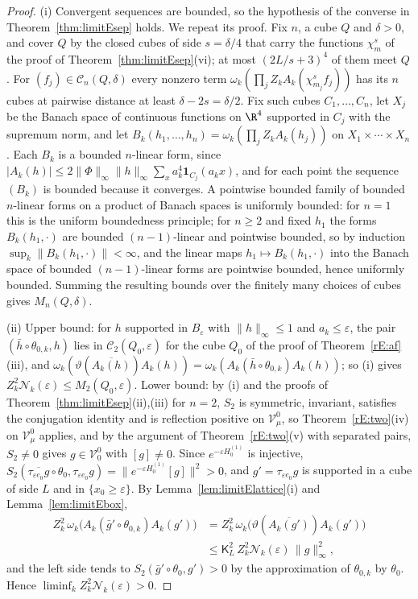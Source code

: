 \begin{proof}
(i) Convergent sequences are bounded, so the hypothesis of the converse in
Theorem~\ref{thm:limitEsep} holds. We repeat its proof. Fix $n$, a cube $Q$
and $\delta>0$, and cover $Q$ by the closed cubes of side $s=\delta/4$ that
carry the functions $\chi^s_m$ of the proof of Theorem~\ref{thm:limitEsep}(vi);
at most $(2L/s+3)^4$ of them meet $Q$. For $(f_j)\in\mathcal C_n(Q,\delta)$
every nonzero term $\omega_k(\prod_jZ_kA_k(\chi^s_{m_j}f_j))$ has its $n$
cubes at pairwise distance at least $\delta-2s=\delta/2$. Fix such cubes
$C_1,\dots,C_n$, let $X_j$ be the Banach space of continuous functions on
$\R^4$ supported in $C_j$ with the supremum norm, and let $B_k(h_1,\dots,
h_n)=\omega_k(\prod_jZ_kA_k(h_j))$ on $X_1\times\cdots\times X_n$. Each $B_k$
is a bounded $n$-linear form, since $|A_k(h)|\le2\|\Phi\|_\infty\|h\|_\infty
\sum_xa_k^4\mathbf 1_{C_j}(a_kx)$, and for each point the sequence $(B_k)$
is bounded because it converges. A pointwise bounded family of bounded
$n$-linear forms on a product of Banach spaces is uniformly bounded: for
$n=1$ this is the uniform boundedness principle; for $n\ge2$ and fixed $h_1$
the forms $B_k(h_1,\cdot)$ are bounded $(n-1)$-linear and pointwise bounded,
so by induction $\sup_k\|B_k(h_1,\cdot)\|<\infty$, and the linear maps $h_1
\mapsto B_k(h_1,\cdot)$ into the Banach space of bounded $(n-1)$-linear
forms are pointwise bounded, hence uniformly bounded. Summing the resulting
bounds over the finitely many choices of cubes gives $M_n(Q,\delta)$.

(ii) Upper bound: for $h$ supported in $B_\varepsilon$ with $\|h\|_\infty\le
1$ and $a_k\le\varepsilon$, the pair $(\bar h\circ\theta_{0,k},h)$ lies in
$\mathcal C_2(Q_0,\varepsilon)$ for the cube $Q_0$ of the proof of
Theorem~\ref{rE:af}(iii), and $\omega_k(\vartheta(\overline{A_k(h)})A_k(h))=
\omega_k(A_k(\bar h\circ\theta_{0,k})A_k(h))$; so (i) gives $Z_k^2\mathcal
N_k(\varepsilon)\le M_2(Q_0,\varepsilon)$. Lower bound: by (i) and the proofs
of Theorem~\ref{thm:limitEsep}(ii),(iii) for $n=2$, $S_2$ is symmetric,
invariant, satisfies the conjugation identity and is reflection positive on
$\mathcal V^0_\mu$, so Theorem~\ref{rE:two}(iv) on $\mathcal V^0_\mu$
applies, and by the argument of Theorem~\ref{rE:two}(v) with separated
pairs, $S_2\ne0$ gives $g\in\mathcal V^0_0$ with $[g]\ne0$. Since
$e^{-\varepsilon H^{(1)}_0}$ is injective, $S_2(\overline{\tau_{\varepsilon
e_0}g}\circ\theta_0,\tau_{\varepsilon e_0}g)=\|e^{-\varepsilon H^{(1)}_0}
[g]\|^2>0$, and $g'=\tau_{\varepsilon e_0}g$ is supported in a cube of side
$L$ and in $\{x_0\ge\varepsilon\}$. By Lemma~\ref{lem:limitElattice}(i) and
Lemma~\ref{lem:limitEbox},
\begin{align*}
Z_k^2\,\omega_k\bigl(A_k(\bar g'\circ\theta_{0,k})A_k(g')\bigr)&=Z_k^2\,
\omega_k\bigl(\vartheta(\overline{A_k(g')})A_k(g')\bigr)\\
&\le\mathsf K_L^2\,Z_k^2\mathcal N_k(\varepsilon)\,\|g\|_\infty^2 ,
\end{align*}
and the left side tends to $S_2(\bar g'\circ\theta_0,g')>0$ by the
approximation of $\theta_{0,k}$ by $\theta_0$. Hence $\liminf_kZ_k^2
\mathcal N_k(\varepsilon)>0$.


\end{proof}
